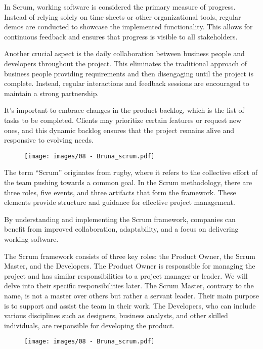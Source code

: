 In Scrum, working software is considered the primary measure of
progress. Instead of relying solely on time sheets or other
organizational tools, regular demos are conducted to showcase the
implemented functionality. This allows for continuous feedback and
ensures that progress is visible to all stakeholders.

Another crucial aspect is the daily collaboration between business
people and developers throughout the project. This eliminates the
traditional approach of business people providing requirements and then
disengaging until the project is complete. Instead, regular interactions
and feedback sessions are encouraged to maintain a strong partnership.

It's important to embrace changes in the product backlog, which is the
list of tasks to be completed. Clients may prioritize certain features
or request new ones, and this dynamic backlog ensures that the project
remains alive and responsive to evolving needs.

\begin{figure}[!h]
    \centering
    \texttt{[image: images/08 - Bruna\_scrum.pdf]}
\end{figure}

The term ``Scrum'' originates from rugby, where it refers to the
collective effort of the team pushing towards a common goal. In the
Scrum methodology, there are three roles, five events, and three
artifacts that form the framework. These elements provide structure and
guidance for effective project management.

By understanding and implementing the Scrum framework, companies can
benefit from improved collaboration, adaptability, and a focus on
delivering working software.

The Scrum framework consists of three key roles: the Product Owner, the
Scrum Master, and the Developers. The Product Owner is responsible for
managing the project and has similar responsibilities to a project
manager or leader. We will delve into their specific responsibilities
later. The Scrum Master, contrary to the name, is not a master over
others but rather a servant leader. Their main purpose is to support and
assist the team in their work. The Developers, who can include various
disciplines such as designers, business analysts, and other skilled
individuals, are responsible for developing the product.

\begin{figure}[!h]
    \centering
    \texttt{[image: images/08 - Bruna\_scrum.pdf]}
\end{figure}


